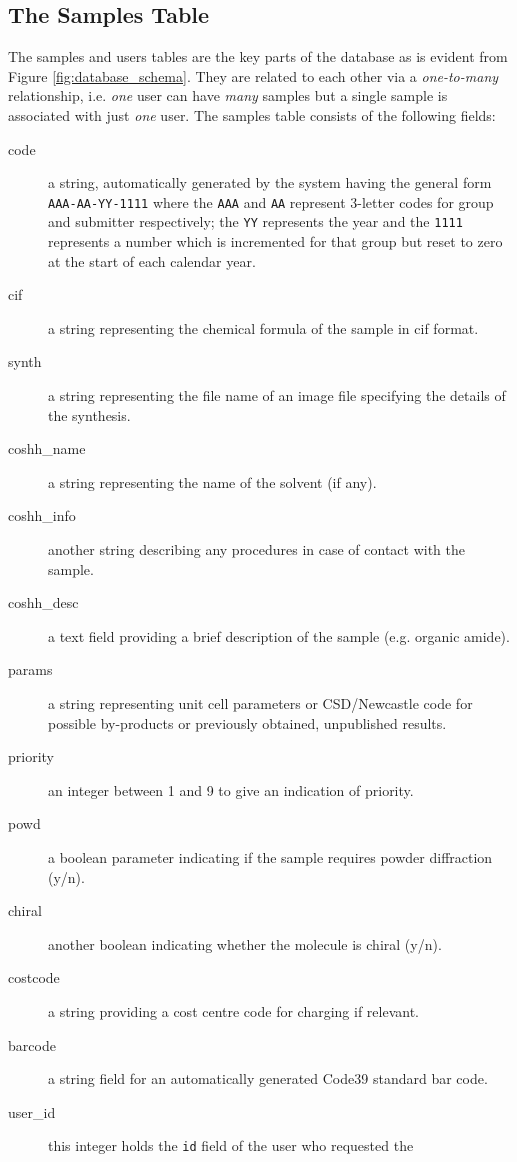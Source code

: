\documentclass[12pt,twoside]{article}
\begin{document}
\subsection{The Samples Table}
The samples and users tables are the key parts of the database as is
evident from Figure \ref{fig:database_schema}. They are related to each
other via a \emph{one-to-many} relationship, i.e. \emph{one} user
can have \emph{many} samples but a single sample is associated with
just \emph{one} user. The samples table consists of the following fields:
\begin{description}
\item[code]
a string, automatically generated by the system having the
general form \verb=AAA-AA-YY-1111= where the \verb=AAA= and \verb=AA= 
represent 3-letter codes for group and submitter respectively; 
the \verb=YY= represents the year and the \verb=1111= represents a number 
which is incremented for that group but reset to zero at the start of each 
calendar year.
\item[cif]
a string representing the chemical formula of the sample in cif format.
\item[synth]
a string representing the file name of an image file specifying the details
of the synthesis.
\item[coshh\_name]
a string representing the name of the solvent (if any).
\item[coshh\_info]
another string describing any procedures in case of contact with the sample.
\item[coshh\_desc]
a text field providing a brief description of the sample (e.g. organic amide).
\item[params]
a string representing unit cell parameters
or CSD/Newcastle code for possible by-products or previously obtained, 
unpublished results.
\item[priority]
an integer between 1 and 9 to give an indication of priority.
\item[powd]
a boolean parameter indicating if the sample requires powder diffraction (y/n).
\item[chiral]
another boolean indicating whether the molecule is chiral (y/n).
\item[costcode]
a string providing a cost centre code for charging if relevant.
\item[barcode]
a string field for an automatically generated Code39 standard bar code.
\item[user\_id]
this integer holds the \verb=id= field of the user who requested the

\end{description}
\end{document}
